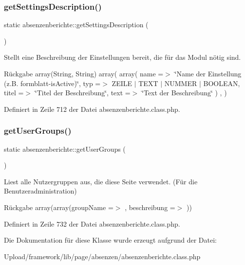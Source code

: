 \subsubsection{\texorpdfstring{get\+Settings\+Description()}{getSettingsDescription()}}
{\footnotesize\ttfamily static absenzenberichte\+::get\+Settings\+Description (\begin{DoxyParamCaption}{ }\end{DoxyParamCaption})\hspace{0.3cm}{\ttfamily [static]}}

Stellt eine Beschreibung der Einstellungen bereit, die für das Modul nötig sind. \begin{DoxyReturn}{Rückgabe}
array(\+String, String) array( array( \textquotesingle{}name\textquotesingle{} =$>$ \char`\"{}\+Name der Einstellung (z.\+B. formblatt-\/is\+Active)\char`\"{}, \textquotesingle{}typ\textquotesingle{} =$>$ Z\+E\+I\+LE $\vert$ T\+E\+XT $\vert$ N\+U\+M\+M\+ER $\vert$ B\+O\+O\+L\+E\+AN, \textquotesingle{}titel\textquotesingle{} =$>$ \char`\"{}\+Titel der Beschreibung\char`\"{}, \textquotesingle{}text\textquotesingle{} =$>$ \char`\"{}\+Text der Beschreibung\char`\"{} ) , ) 
\end{DoxyReturn}


Definiert in Zeile 712 der Datei absenzenberichte.\+class.\+php.

\mbox{\label{classabsenzenberichte_a38543af0b1b92037c513fafe6abaa342}} 
\subsubsection{\texorpdfstring{get\+User\+Groups()}{getUserGroups()}}
{\footnotesize\ttfamily static absenzenberichte\+::get\+User\+Groups (\begin{DoxyParamCaption}{ }\end{DoxyParamCaption})\hspace{0.3cm}{\ttfamily [static]}}

Liest alle Nutzergruppen aus, die diese Seite verwendet. (Für die Benutzeradministration) \begin{DoxyReturn}{Rückgabe}
array(array(\textquotesingle{}group\+Name\textquotesingle{} =$>$ \textquotesingle{}\textquotesingle{}, \textquotesingle{}beschreibung\textquotesingle{} =$>$ \textquotesingle{}\textquotesingle{})) 
\end{DoxyReturn}


Definiert in Zeile 732 der Datei absenzenberichte.\+class.\+php.



Die Dokumentation für diese Klasse wurde erzeugt aufgrund der Datei\+:\begin{DoxyCompactItemize}
\item 
Upload/framework/lib/page/absenzen/absenzenberichte.\+class.\+php\end{DoxyCompactItemize}
